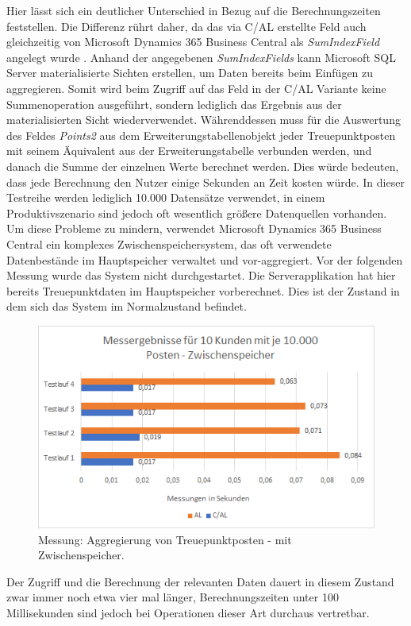 Hier lässt sich ein deutlicher Unterschied in Bezug auf die Berechnungszeiten feststellen. Die Differenz rührt daher, da das via C/AL erstellte Feld auch gleichzeitig von Microsoft Dynamics 365 Business Central als \textit{SumIndexField} angelegt wurde \cite{Stryk2014}. Anhand der angegebenen \textit{SumIndexFields} kann Microsoft SQL Server materialisierte Sichten erstellen, um Daten bereits beim Einfügen zu aggregieren. Somit wird beim Zugriff auf das Feld in der C/AL Variante keine Summenoperation ausgeführt, sondern lediglich das Ergebnis aus der materialisierten Sicht wiederverwendet. Währenddessen muss für die Auswertung des Feldes \textit{Points2} aus dem Erweiterungstabellenobjekt jeder Treuepunktposten mit seinem Äquivalent aus der Erweiterungstabelle verbunden werden, und danach die Summe der einzelnen Werte berechnet werden. Dies würde bedeuten, dass jede Berechnung den Nutzer einige Sekunden an Zeit kosten würde. In dieser Testreihe werden lediglich 10.000 Datensätze verwendet, in einem Produktivszenario sind jedoch oft wesentlich größere Datenquellen vorhanden. Um diese Probleme zu mindern, verwendet Microsoft Dynamics 365 Business Central ein komplexes Zwischenspeichersystem, das oft verwendete Datenbestände im Hauptspeicher verwaltet und vor-aggregiert. 
Vor der folgenden Messung wurde das System nicht durchgestartet. Die Serverapplikation hat hier bereits Treuepunktdaten im Hauptspeicher vorberechnet. Dies ist der Zustand in dem sich das System im Normalzustand befindet.
\begin{figure}[H]
	\centering
	\includegraphics[width=140mm]{images/Test2Cache}
	\caption{Messung: Aggregierung von Treuepunktposten - mit Zwischenspeicher.}
	\label{fig:Test2Schema}
\end{figure}

Der Zugriff und die Berechnung der relevanten Daten dauert in diesem Zustand zwar immer noch etwa vier mal länger, Berechnungszeiten unter 100 Millisekunden sind jedoch bei Operationen dieser Art durchaus vertretbar.

